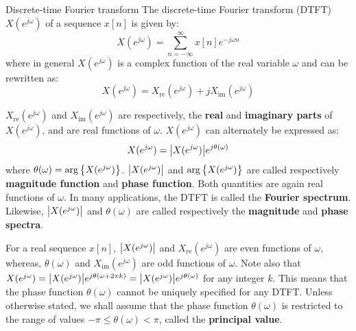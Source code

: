 \documentclass[../../main/main.tex]{subfiles}
\begin{document}
\begin{definition}{Discrete-time Fourier transform}{}
    The discrete-time Fourier transform (DTFT) \( X(e^{j\omega}) \) of a sequence \( x[n] \) is given by:
    \begin{equation}
        X(e^{j\omega})
        =
        \sum_{n=-\infty}^{\infty} x[n] e^{-j\omega n}
        \label{eq:L08_S17_1}
    \end{equation}
    where in general \( X(e^{j\omega}) \) is a complex function of the real variable \( \omega \) and can be rewritten as:
    \begin{equation}
        X(e^{j\omega})
        =
        X_{\mathrm{re}}(e^{j\omega}) + j X_{\mathrm{im}}(e^{j\omega})
        \label{eq:L08_S17_2}
    \end{equation}
\end{definition}

\( X_{\mathrm{re}}(e^{j\omega}) \) and \( X_{\mathrm{im}}(e^{j\omega}) \) are respectively, the \textbf{real} and \textbf{imaginary parts} of \( X(e^{j\omega}) \), and are real functions of \( \omega \). \( X(e^{j\omega}) \) can alternately be expressed as:
\begin{equation}
    X(e^{j\omega})
    =
    \abs{X(e^{j\omega})} e^{j\theta(\omega)}
    \label{eq:L08_S18_1}
\end{equation}
where \( \theta(\omega) = \arg\qty{X(e^{j\omega})} \).
\( \abs{X(e^{j\omega})} \) and \( \arg\qty{X(e^{j\omega})} \) are called respectively \textbf{magnitude function} and \textbf{phase function}.
Both quantities are again real functions of \( \omega \). In many applications, the DTFT is called the \textbf{Fourier spectrum}. Likewise, \( \abs{X(e^{j\omega})} \) and \( \theta(\omega) \) are called respectively the \textbf{magnitude} and \textbf{phase spectra}.

\medskip
For a real sequence \( x[n] \), \( \abs{X(e^{j\omega})} \) and \( X_{\mathrm{re}}(e^{j\omega}) \) are even functions of \( \omega \),
whereas, \( \theta(\omega) \) and \( X_{\mathrm{im}}(e^{j\omega}) \) are odd functions of \( \omega \).
Note also that \( X(e^{j\omega}) = \abs{X(e^{j\omega})} e^{j\theta(\omega + 2\pi k)} = \abs{X(e^{j\omega})} e^{j\theta(\omega)} \) for any integer \( k \). This means that the phase function \( \theta(\omega) \) cannot be uniquely specified for any DTFT.
Unless otherwise stated, we shall assume that the phase function \( \theta(\omega) \) is restricted to the range of values \( -\pi \le \theta(\omega) < \pi \), called the \textbf{principal value}.
\end{document}
